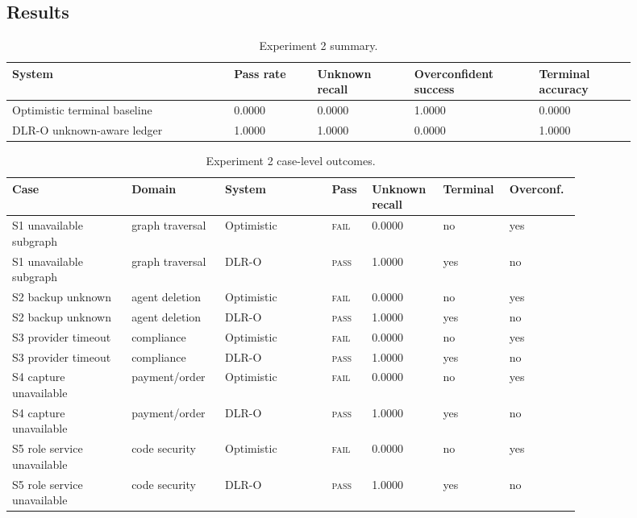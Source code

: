 \documentclass[11pt]{article}
\newcommand{\pass}{\textsc{pass}}
\newcommand{\fail}{\textsc{fail}}
\begin{document}
\subsection{Results}

\begin{table}[h]
\centering
\caption{Experiment 2 summary.}
\label{tab:unknown_summary}
\small
\setlength{\tabcolsep}{2pt}
\begin{tabular}{L{0.32\linewidth}C{0.12\linewidth}C{0.14\linewidth}C{0.18\linewidth}C{0.14\linewidth}}
\toprule
System & Pass rate & Unknown recall & Overconfident success & Terminal accuracy \\
\midrule
Optimistic terminal baseline & 0.0000 & 0.0000 & 1.0000 & 0.0000 \\
DLR-O unknown-aware ledger & 1.0000 & 1.0000 & 0.0000 & 1.0000 \\
\bottomrule
\end{tabular}
\end{table}

\begin{table}[h]
\centering
\caption{Experiment 2 case-level outcomes.}
\label{tab:unknown_scores}
\scriptsize
\setlength{\tabcolsep}{2pt}
\begin{tabular}{L{0.19\linewidth}L{0.14\linewidth}L{0.17\linewidth}C{0.06\linewidth}C{0.10\linewidth}C{0.07\linewidth}C{0.09\linewidth}}
\toprule
Case & Domain & System & Pass & Unknown recall & Terminal & Overconf. \\
\midrule
S1 unavailable subgraph & graph traversal & Optimistic & \fail & 0.0000 & no & yes \\
S1 unavailable subgraph & graph traversal & DLR-O & \pass & 1.0000 & yes & no \\
S2 backup unknown & agent deletion & Optimistic & \fail & 0.0000 & no & yes \\
S2 backup unknown & agent deletion & DLR-O & \pass & 1.0000 & yes & no \\
S3 provider timeout & compliance & Optimistic & \fail & 0.0000 & no & yes \\
S3 provider timeout & compliance & DLR-O & \pass & 1.0000 & yes & no \\
S4 capture unavailable & payment/order & Optimistic & \fail & 0.0000 & no & yes \\
S4 capture unavailable & payment/order & DLR-O & \pass & 1.0000 & yes & no \\
S5 role service unavailable & code security & Optimistic & \fail & 0.0000 & no & yes \\
S5 role service unavailable & code security & DLR-O & \pass & 1.0000 & yes & no \\
\bottomrule
\end{tabular}
\end{table}
\end{document}

